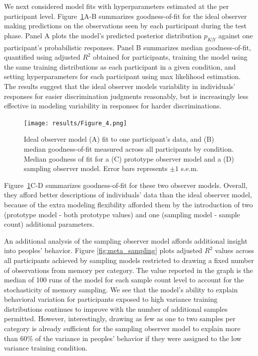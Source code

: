 \documentclass[10pt,letterpaper]{article}
\begin{document}
We next considered model fits with hyperparameters estimated at the per participant level. Figure~\ref{fig:Figure_4}A-B summarizes goodness-of-fit for the ideal observer making predictions on the observations seen by each participant during the test phase. Panel A plots the model's predicted posterior distribution $p_{K|Y}$ against one participant's probabilistic responses. Panel B summarizes median goodness-of-fit, quantified using adjusted $R^2$ obtained for participants, training the model using the same training distributions as each participant in a given condition, and setting hyperparameters for each participant using max likelihood estimation. The results suggest that the ideal observer models variability in individuals' responses for easier discrimination judgments reasonably, but is increasingly less effective in modeling variability in responses for harder discriminations. 

\begin{figure}[h!]
    \centering
    \texttt{[image: results/Figure\_4.png]}
    \caption{Ideal observer model (A) fit to one participant's data, and (B) median goodness-of-fit measured across all participants by condition. Median goodness of fit for a (C) prototype observer model and a (D) sampling observer model. Error bars represents $\pm 1$ s.e.m.} 
    \label{fig:Figure_4}
\end{figure}

Figure~\ref{fig:Figure_4}C-D summarizes goodness-of-fit for these two observer models. Overall, they afford better descriptions of individuals' data than the ideal observer model, because of the extra modeling flexibility afforded them by the introduction of two (prototype model - both prototype values) and one (sampling model - sample count) additional parameters. 

An additional analysis of the sampling observer model affords additional insight into peoples' behavior. Figure \ref{fig:meta_sampling} plots adjusted $R^2$ values across all participants achieved by sampling models restricted to drawing a fixed number of observations from memory per category. The value reported in the graph is the median of 100 runs of the model for each sample count level to account for the stochasticity of memory sampling. We see that the model's ability to explain behavioral variation for participants exposed to high variance training distributions continues to improve with the number of additional samples permitted. However, interestingly, drawing as few as one to two samples per category is already sufficient for the sampling observer model to explain more than 60\% of the variance in peoples' behavior if they were assigned to the low variance training condition.   
\end{document}
